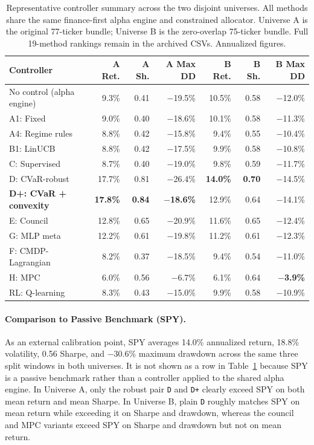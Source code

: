 \documentclass[10pt,twocolumn]{article}
\begin{document}
\begin{table}[t]
\centering
\small
\caption{Representative controller summary across the two disjoint universes.
All methods share the same finance-first alpha engine and constrained allocator.
Universe A is the original 77-ticker bundle; Universe B is the zero-overlap
75-ticker bundle. Full 19-method rankings remain in the archived CSVs.
Annualized figures.}
\label{tab:metrics}
\begin{tabular}{@{} l r r r r r r @{}}
\toprule
\textbf{Controller} & \textbf{A Ret.} & \textbf{A Sh.} & \textbf{A Max DD} & \textbf{B Ret.} & \textbf{B Sh.} & \textbf{B Max DD} \\
\midrule
No control (alpha engine) & 9.3\% & 0.41 & $-$19.5\% & 10.5\% & 0.58 & $-$12.0\% \\
A1: Fixed & 9.0\% & 0.40 & $-$18.6\% & 10.1\% & 0.58 & $-$11.3\% \\
A4: Regime rules & 8.8\% & 0.42 & $-$15.8\% & 9.4\% & 0.55 & $-$10.4\% \\
B1: LinUCB & 8.8\% & 0.42 & $-$17.5\% & 9.9\% & 0.58 & $-$10.8\% \\
C: Supervised & 8.7\% & 0.40 & $-$19.0\% & 9.8\% & 0.59 & $-$11.7\% \\
D: CVaR-robust & 17.7\% & 0.81 & $-$26.4\% & \textbf{14.0\%} & \textbf{0.70} & $-$14.5\% \\
\textbf{D+: CVaR + convexity} & \textbf{17.8\%} & \textbf{0.84} & \textbf{$-$18.6\%} & 12.9\% & 0.64 & $-$14.1\% \\
E: Council & 12.8\% & 0.65 & $-$20.9\% & 11.6\% & 0.65 & $-$12.4\% \\
G: MLP meta & 12.2\% & 0.61 & $-$19.8\% & 11.2\% & 0.61 & $-$12.3\% \\
F: CMDP-Lagrangian & 8.2\% & 0.37 & $-$18.5\% & 9.4\% & 0.54 & $-$11.0\% \\
H: MPC & 6.0\% & 0.56 & $-$6.7\% & 6.1\% & 0.64 & \textbf{$-$3.9\%} \\
RL: Q-learning & 8.3\% & 0.43 & $-$15.0\% & 9.9\% & 0.58 & $-$10.9\% \\
\bottomrule
\end{tabular}
\end{table}

\paragraph{Comparison to Passive Benchmark (SPY).}
As an external calibration point, SPY averages 14.0\% annualized return,
18.8\% volatility, 0.56 Sharpe, and $-$30.6\% maximum drawdown across the same
three split windows in both universes. It is not shown as a row in
Table~\ref{tab:metrics} because SPY is a passive benchmark rather than a
controller applied to the shared alpha engine. In Universe A, only the robust
pair \texttt{D} and \texttt{D+} clearly exceed SPY on both mean return and mean
Sharpe. In Universe B, plain \texttt{D} roughly matches SPY on mean return
while exceeding it on Sharpe and drawdown, whereas the council and MPC variants
exceed SPY on Sharpe and drawdown but not on mean return.
\end{document}
